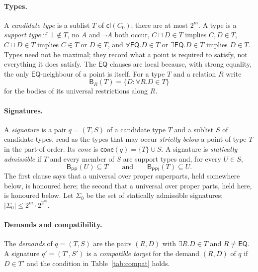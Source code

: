\documentclass[11pt]{article}
\newcommand{\PP}{\mathsf{PP}}
\newcommand{\PPI}{\mathsf{PPI}}
\newcommand{\EQ}{\mathsf{EQ}}
\newcommand{\cl}{\mathsf{cl}}
\newcommand{\cone}{\mathsf{cone}}
\newcommand{\Bod}{\mathsf{B}}
\theoremstyle{plain}
\theoremstyle{definition}
\begin{document}
\paragraph{Types.} A \emph{candidate type} is a sublist $T$ of $\cl(C_0)$; there
are at most $2^m$. A type is a \emph{support type} if $\bot\notin T$, no $A$ and
$\neg A$ both occur, $C\sqcap D\in T$ implies $C,D\in T$, $C\sqcup D\in T$
implies $C\in T$ or $D\in T$, and $\forall\EQ.D\in T$ or $\exists\EQ.D\in T$
implies $D\in T$. Types need not be maximal; they record what a point is
required to satisfy, not everything it does satisfy. The $\EQ$ clauses are local
because, with strong equality, the only $\EQ$-neighbour of a point is itself.
For a type $T$ and a relation $R$ write
\[
  \Bod_R(T)=\{D : \forall R.D\in T\}
\]
for the bodies of its universal restrictions along $R$.

\paragraph{Signatures.} A \emph{signature} is a pair $q=(T,S)$ of a candidate
type $T$ and a sublist $S$ of candidate types, read as the types that may occur
\emph{strictly below} a point of type $T$ in the part-of order. Its \emph{cone}
is $\cone(q)=\{T\}\cup S$. A signature is \emph{statically admissible} if $T$
and every member of $S$ are support types and, for every $U\in S$,
\[
  \Bod_\PP(U)\subseteq T \qquad\text{and}\qquad \Bod_\PPI(T)\subseteq U .
\]
The first clause says that a universal over proper superparts, held somewhere
below, is honoured here; the second that a universal over proper parts, held
here, is honoured below. Let $\Sigma_0$ be the set of statically admissible
signatures; $|\Sigma_0|\le 2^m\cdot 2^{2^m}$.

\paragraph{Demands and compatibility.} The \emph{demands} of $q=(T,S)$ are the
pairs $(R,D)$ with $\exists R.D\in T$ and $R\neq\EQ$. A signature $q'=(T',S')$ is
a \emph{compatible target} for the demand $(R,D)$ of $q$ if $D\in T'$ and the
condition in Table~\ref{tab:compat} holds.
\end{document}

